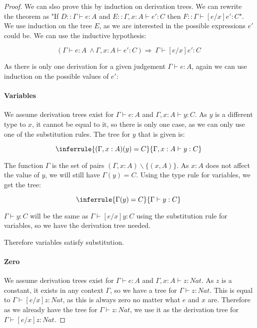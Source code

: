 \begin{proof}
We can slso prove this by induction on derivation trees. We can rewrite the theorem as "If $D :: \Gamma \vdash e:A$ and $E :: \Gamma, x:A \vdash e' : C$ then $F ::\Gamma \vdash [e/x] e' : C$". We use induction on the tree $E$, as we are interested in the possible expressions $e'$ could be. We can use the inductive hypothesis:

\[(\Gamma \vdash e:A \ \wedge \Gamma, x:A \vdash e' : C) \Rightarrow \ \Gamma \vdash [e/x] e' : C\]

As there is only one derivation for a given judgement $\Gamma \vdash e : A$, again we can use induction on the possible values of $e'$:

\paragraph{Variables} We assume derivation trees exist for $\Gamma \vdash e : A$ and $\Gamma, x : A \vdash y : C$. As $y$ is a different type to $x$, it cannot be equal to it, so there is only one case, as we can only use one of the substitution rules. The tree for $y$ that is given is:

$$\inferrule{(\Gamma,x:A)(y) = C}{\Gamma, x:A \vdash y : C}$$

The function $\Gamma$ is the set of pairs $(\Gamma,x:A)\backslash \{(x,A)\}$. As $x:A$ does not affect the value of $y$, we will still have $\Gamma(y) = C$. Using the type rule for variables, we get the tree:

$$\inferrule{\Gamma(y) = C}{\Gamma \vdash y : C}$$

$\Gamma \vdash y : C$ will be the same as $\Gamma \vdash [e/x]y : C$ using the substitution rule for variables, so we have the derivation tree needed.

Therefore variables satisfy substitution.  



\paragraph{Zero} We assume derivation trees exist for $\Gamma \vdash e : A$ and $\Gamma, x : A \vdash z : Nat$. As $z$ is a constant, it exists in any context $\Gamma$, so we have a tree for $\Gamma \vdash z : Nat$. This is equal to $\Gamma \vdash [e/x]z : Nat$, as this is always zero no matter what $e$ and $x$ are. Therefore as we already have the tree for $\Gamma \vdash z : Nat$, we use it as the derivation tree for $\Gamma \vdash [e/x]z : Nat$.


\end{proof}
